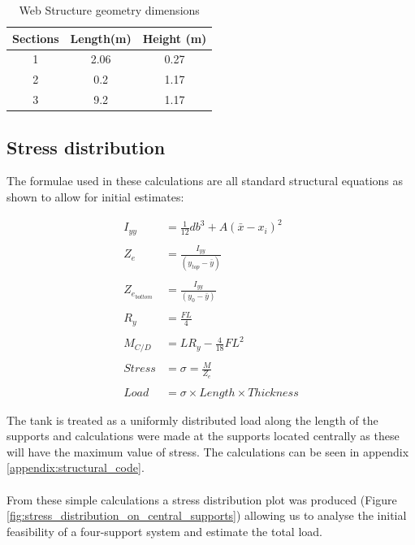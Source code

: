 \begin{table}[h!]
  \centering
  \begin{tabular}{|c|c|c|}
    \hline
    Sections & Length(m) & Height (m) \\
    \hline
    1 & 2.06 & 0.27 \\
    2 & 0.2 & 1.17 \\
    3 & 9.2 & 1.17 \\
    \hline
  \end{tabular}
  \caption{Web Structure geometry dimensions}
  \label{tab:web_structure_geometry_dimensions}
\end{table}

\subsection{Stress distribution}
The formulae used in these calculations are all standard structural equations as shown to allow for initial estimates: 

\begin{equation}
\begin{split}
  I_{yy} & = \frac{1}{12} d b^{3} + A(\bar{x} - x_{i})^{2} \\ \\
  Z_{e} & = \frac{I_{yy}}{(y_{top} - \bar{y})} \\ \\
  Z_{e_{bottom}} & = \frac{I_{yy}}{(y_{0} - \bar{y})} \\ \\
  R_{y} & = \frac{FL}{4} \\ \\ 
  M_{C/D} & = L R_{y} - \frac{4}{18} FL^{2} \\ \\
  Stress & = \sigma = \frac{M}{Z_{e}} \\ \\
  Load & = \sigma \times Length \times Thickness
\end{split}
  \label{eqn:structures_equations}
\end{equation}

The tank is treated as a uniformly distributed load along the length of the supports and calculations were made at the supports located centrally as these will have the maximum value of stress. The calculations can be seen in appendix \ref{appendix:structural_code}.
\\ \\ 

From these simple calculations a stress distribution plot was produced (Figure \ref{fig:stress_distribution_on_central_supports}) allowing us to analyse the initial feasibility of a four-support system and estimate the total load. 

